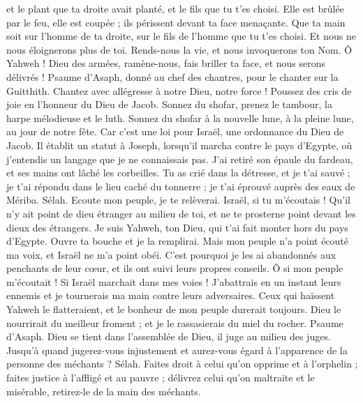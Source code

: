 \begin{multicols}{2}
et le plant que ta droite avait planté, et le fils que tu t'es choisi.
Elle est brûlée par le feu, elle est coupée ; ils périssent devant ta face menaçante.
Que ta main soit sur l'homme de ta droite, sur le fils de l'homme que tu t'es choisi.
Et nous ne nous éloignerons plus de toi. Rends-nous la vie, et nous invoquerons ton Nom.
Ô Yahweh ! Dieu des armées, ramène-nous, fais briller ta face, et nous serons délivrés !
\VerseOne{}Psaume d'Asaph, donné au chef des chantres, pour le chanter sur la Guitthith.
Chantez avec allégresse à notre Dieu, notre force ! Poussez des cris de joie en l'honneur du Dieu de Jacob.
Sonnez du shofar, prenez le tambour, la harpe mélodieuse et le luth.
Sonnez du shofar à la nouvelle lune, à la pleine lune, au jour de notre fête.
Car c'est une loi pour Israël, une ordonnance du Dieu de Jacob.
Il établit un statut à Joseph, lorsqu'il marcha contre le pays d'Egypte, où j'entendis un langage que je ne connaissais pas.
J'ai retiré son épaule du fardeau, et ses mains ont lâché les corbeilles.
Tu as crié dans la détresse, et je t'ai sauvé ; je t'ai répondu dans le lieu caché du tonnerre ; je t'ai éprouvé auprès des eaux de Mériba. Sélah.
Ecoute mon peuple, je te relèverai. Israël, si tu m'écoutais !
Qu'il n'y ait point de dieu étranger au milieu de toi, et ne te prosterne point devant les dieux des étrangers.
Je suis Yahweh, ton Dieu, qui t'ai fait monter hors du pays d'Egypte. Ouvre ta bouche et je la remplirai.
Mais mon peuple n'a point écouté ma voix, et Israël ne m'a point obéi.
C'est pourquoi je les ai abandonnés aux penchants de leur cœur, et ils ont suivi leurs propres conseils.
Ô si mon peuple m'écoutait ! Si Israël marchait dans mes voies !
J'abattrais en un instant leurs ennemis et je tournerais ma main contre leurs adversaires.
Ceux qui haïssent Yahweh le flatteraient, et le bonheur de mon peuple durerait toujours.
Dieu le nourrirait du meilleur froment ; et je le rassasierais du miel du rocher.
\VerseOne{}Psaume d'Asaph. Dieu se tient dans l'assemblée de Dieu, il juge au milieu des juges.
Jusqu'à quand jugerez-vous injustement et aurez-vous égard à l'apparence de la personne des méchants ? Sélah.
Faites droit à celui qu'on opprime et à l'orphelin ; faites justice à l'affligé et au pauvre ;
délivrez celui qu'on maltraite et le misérable, retirez-le de la main des méchants.

\end{multicols}
